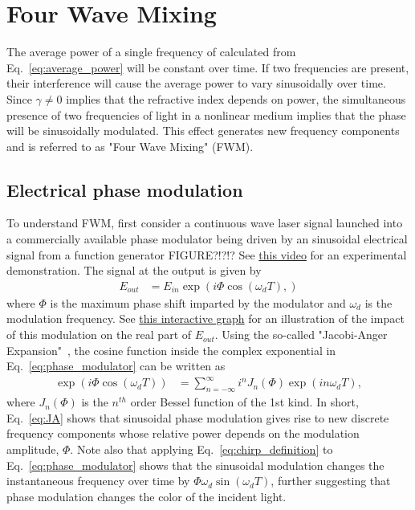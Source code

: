 \chapter{Four Wave Mixing}
\label{ch:FWM}

The average power of a single frequency of calculated from Eq.~\ref{eq:average_power} will be constant over time. If two frequencies are present, their interference will cause the average power to vary sinusoidally over time. Since $\gamma\neq0$ implies that the refractive index depends on power, the simultaneous presence of two frequencies of light in a nonlinear medium implies that the phase will be sinusoidally modulated. This effect generates new frequency components and is referred to as "Four Wave Mixing" (FWM).




\section{Electrical phase modulation}
To understand FWM, first consider a continuous wave laser signal launched into a commercially available phase modulator being driven by an sinusoidal electrical signal from a function generator FIGURE?!?!? See \href{https://youtu.be/j8It3to54AQ}{this video} for an experimental demonstration. The signal at the output is given by
\begin{align}
    \label{eq:phase_modulator}
    E_{out}&=E_{in}\exp\left(i\Phi\cos(\omega_dT), \right)
\end{align}
where $\Phi$ is the maximum phase shift imparted by the modulator and $\omega_d$ is the modulation frequency. See \href{https://www.desmos.com/calculator/vcreo1gs2q}{this interactive graph} for an illustration of the impact of this modulation on the real part of $E_{out}$. Using the so-called "Jacobi-Anger Expansion"~\cite{NIST_JA_expansion}, the cosine function inside the complex exponential in Eq.~\ref{eq:phase_modulator} can be written as
\begin{align}
\label{eq:JA}
    \exp\left(i\Phi\cos(\omega_dT)\right) &= \sum_{n=-\infty}^{\infty}i^n J_n(\Phi) \exp\left(in\omega_dT\right),
\end{align}
where $J_n(\Phi)$ is the $n^{th}$ order Bessel function of the 1st kind. In short, Eq.~\ref{eq:JA} shows that sinusoidal phase modulation gives rise to new discrete frequency components whose relative power depends on the modulation amplitude, $\Phi$. Note also that applying Eq.~\ref{eq:chirp_definition} to Eq.~\ref{eq:phase_modulator} shows that the sinusoidal modulation changes the instantaneous frequency over time by $\Phi\omega_d\sin(\omega_dT)$, further suggesting that phase modulation changes the color of the incident light.


